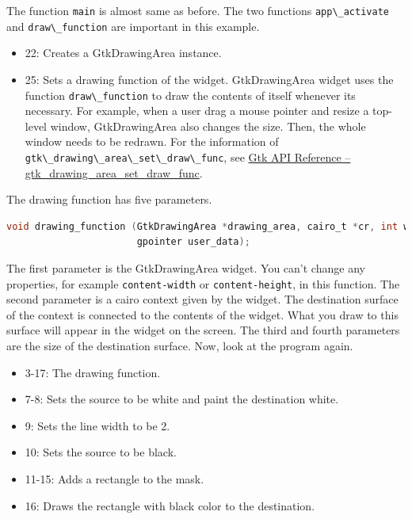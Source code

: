 The function \passthrough{\lstinline!main!} is almost same as before.
The two functions \passthrough{\lstinline!app\_activate!} and
\passthrough{\lstinline!draw\_function!} are important in this example.

\begin{itemize}
\tightlist
\item
  22: Creates a GtkDrawingArea instance.
\item
  25: Sets a drawing function of the widget. GtkDrawingArea widget uses
  the function \passthrough{\lstinline!draw\_function!} to draw the
  contents of itself whenever its necessary. For example, when a user
  drag a mouse pointer and resize a top-level window, GtkDrawingArea
  also changes the size. Then, the whole window needs to be redrawn. For
  the information of
  \passthrough{\lstinline!gtk\_drawing\_area\_set\_draw\_func!}, see
  \href{https://docs.gtk.org/gtk4/method.DrawingArea.set_draw_func.html}{Gtk
  API Reference -- gtk\_drawing\_area\_set\_draw\_func}.
\end{itemize}

The drawing function has five parameters.

\begin{lstlisting}[language=C]
void drawing_function (GtkDrawingArea *drawing_area, cairo_t *cr, int width, int height,
                       gpointer user_data);
\end{lstlisting}

The first parameter is the GtkDrawingArea widget. You can't change any
properties, for example \passthrough{\lstinline!content-width!} or
\passthrough{\lstinline!content-height!}, in this function. The second
parameter is a cairo context given by the widget. The destination
surface of the context is connected to the contents of the widget. What
you draw to this surface will appear in the widget on the screen. The
third and fourth parameters are the size of the destination surface.
Now, look at the program again.

\begin{itemize}
\tightlist
\item
  3-17: The drawing function.
\item
  7-8: Sets the source to be white and paint the destination white.
\item
  9: Sets the line width to be 2.
\item
  10: Sets the source to be black.
\item
  11-15: Adds a rectangle to the mask.
\item
  16: Draws the rectangle with black color to the destination.
\end{itemize}

